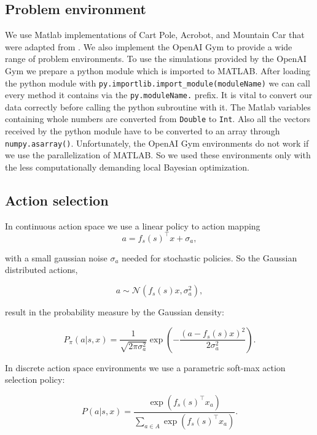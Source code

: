 \subsection{Problem environment}
We use Matlab implementations of Cart Pole, Acrobot, and Mountain Car that were adapted from \cite{joseCode}. We also implement the OpenAI Gym \cite{DBLP:journals/corr/BrockmanCPSSTZ16} to provide a wide range of problem environments. To use the simulations provided by the OpenAI Gym we prepare a python module which is imported to MATLAB. After loading the python module with \verb|py.importlib.import_module(moduleName)| we can call every method it contains via the \verb|py.moduleName.| prefix. It is vital to convert our data correctly before calling the python subroutine with it. The Matlab variables containing whole numbers are converted from \verb|Double| to \verb|Int|. Also all the vectors received by the python module have to be converted to an array through \verb|numpy.asarray()|. Unfortunately, the OpenAI Gym environments do not work if we use the parallelization of MATLAB. So we used these environments only with the less computationally demanding local Bayesian optimization.\\

\subsection{Action selection}
\label{sec:actionselection}
In continuous action space we use a linear policy to action mapping
\begin{equation} \label{eq:actionselection}
    a = f_s(s)^\top x + \sigma_a,
\end{equation}

with a small gaussian noise $\sigma_a$ needed for stochastic policies. So the Gaussian distributed actions,

$$a \sim \mathcal{N}(f_s(s) x,\sigma_a^2),$$

result in the probability measure by the Gaussian density:

\begin{equation}\label{eq:contiAS}
    P_{\pi}(a|s,x) = \frac{1}{\sqrt{2\pi\sigma_a^2}}\exp\left(-\frac{(a-f_s(s)x)^2}{2\sigma_a^2}\right).
\end{equation}

In discrete action space environments we use a parametric soft-max action selection policy:

\begin{equation} \label{eq:discreteactionselection}
    P(a|s,x)= \frac{\exp(f_s(s)^\top x_a)}{\sum_{a\in A} \exp(f_s(s)^\top x_a)}.
\end{equation}

